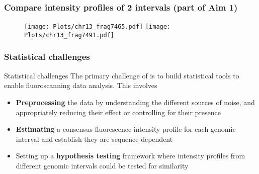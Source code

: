\documentclass[10pt,dvipsnames,table]{beamer}
\begin{document}
\begin{frame}
\frametitle{Compare intensity profiles of 2 intervals (part of Aim 1)}
\begin{figure}[t]
\texttt{[image: Plots/chr13\_frag7465.pdf]}
\texttt{[image: Plots/chr13\_frag7491.pdf]}
\end{figure}
\end{frame}

\begin{frame}
\frametitle{Statistical challenges}
\begin{block}{Statistical challenges}
The primary challenge of is to build statistical tools to enable fluoroscanning data analysis. This involves
\begin{itemize}
\item {\bf{Preprocessing}} the data by understanding the different sources of noise, and appropriately reducing their effect or controlling for their presence
\item {\bf{Estimating}} a consensus fluorescence intensity profile for each genomic interval and establish they are sequence dependent
\item Setting up a {\bf{hypothesis testing}} framework where intensity profiles from different genomic intervals could be tested for similarity
\end{itemize}
\end{block}
\end{frame}
\end{document}
